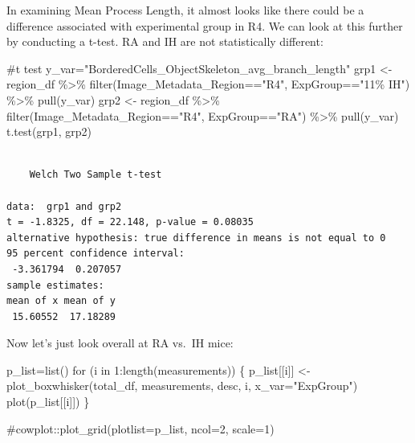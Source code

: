 \documentclass[
  12pt,
  letterpaper,
  DIV=11,
  numbers=noendperiod]{scrartcl}
\newenvironment{Shaded}{\begin{snugshade}}{\end{snugshade}}
\newcommand{\AttributeTok}[1]{\textcolor[rgb]{0.40,0.45,0.13}{#1}}
\newcommand{\CommentTok}[1]{\textcolor[rgb]{0.37,0.37,0.37}{#1}}
\newcommand{\ControlFlowTok}[1]{\textcolor[rgb]{0.00,0.23,0.31}{#1}}
\newcommand{\DecValTok}[1]{\textcolor[rgb]{0.68,0.00,0.00}{#1}}
\newcommand{\FunctionTok}[1]{\textcolor[rgb]{0.28,0.35,0.67}{#1}}
\newcommand{\NormalTok}[1]{\textcolor[rgb]{0.00,0.23,0.31}{#1}}
\newcommand{\OtherTok}[1]{\textcolor[rgb]{0.00,0.23,0.31}{#1}}
\newcommand{\SpecialCharTok}[1]{\textcolor[rgb]{0.37,0.37,0.37}{#1}}
\newcommand{\StringTok}[1]{\textcolor[rgb]{0.13,0.47,0.30}{#1}}
\begin{document}
In examining Mean Process Length, it almost looks like there could be a
difference associated with experimental group in R4. We can look at this
further by conducting a t-test. RA and IH are not statistically
different:

\begin{Shaded}
\begin{Highlighting}[]
\CommentTok{\#t test}
\NormalTok{y\_var}\OtherTok{=}\StringTok{"BorderedCells\_ObjectSkeleton\_avg\_branch\_length"}
\NormalTok{grp1 }\OtherTok{\textless{}{-}}\NormalTok{ region\_df }\SpecialCharTok{\%\textgreater{}\%} \FunctionTok{filter}\NormalTok{(Image\_Metadata\_Region}\SpecialCharTok{==}\StringTok{"R4"}\NormalTok{, ExpGroup}\SpecialCharTok{==}\StringTok{"11\% IH"}\NormalTok{) }\SpecialCharTok{\%\textgreater{}\%} \FunctionTok{pull}\NormalTok{(y\_var)}
\NormalTok{grp2 }\OtherTok{\textless{}{-}}\NormalTok{ region\_df }\SpecialCharTok{\%\textgreater{}\%} \FunctionTok{filter}\NormalTok{(Image\_Metadata\_Region}\SpecialCharTok{==}\StringTok{"R4"}\NormalTok{, ExpGroup}\SpecialCharTok{==}\StringTok{"RA"}\NormalTok{) }\SpecialCharTok{\%\textgreater{}\%} \FunctionTok{pull}\NormalTok{(y\_var)}
\FunctionTok{t.test}\NormalTok{(grp1, grp2)}
\end{Highlighting}
\end{Shaded}

\begin{verbatim}

    Welch Two Sample t-test

data:  grp1 and grp2
t = -1.8325, df = 22.148, p-value = 0.08035
alternative hypothesis: true difference in means is not equal to 0
95 percent confidence interval:
 -3.361794  0.207057
sample estimates:
mean of x mean of y 
 15.60552  17.18289 
\end{verbatim}

Now let's just look overall at RA vs.~IH mice:

\begin{Shaded}
\begin{Highlighting}[]
\NormalTok{p\_list}\OtherTok{=}\FunctionTok{list}\NormalTok{()}
\ControlFlowTok{for}\NormalTok{ (i }\ControlFlowTok{in} \DecValTok{1}\SpecialCharTok{:}\FunctionTok{length}\NormalTok{(measurements)) \{}
\NormalTok{  p\_list[[i]] }\OtherTok{\textless{}{-}} \FunctionTok{plot\_boxwhisker}\NormalTok{(total\_df, measurements, desc, i, }\AttributeTok{x\_var=}\StringTok{"ExpGroup"}\NormalTok{)}
  \FunctionTok{plot}\NormalTok{(p\_list[[i]])}
\NormalTok{\}}

\CommentTok{\#cowplot::plot\_grid(plotlist=p\_list, ncol=2, scale=1)}
\end{Highlighting}
\end{Shaded}
\end{document}
